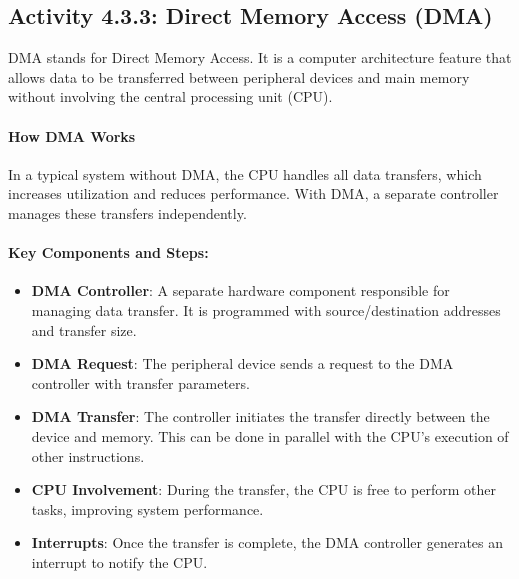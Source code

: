 \documentclass[12pt,a4paper]{article}
\begin{document}

\subsection*{Activity 4.3.3: Direct Memory Access (DMA)}
DMA stands for Direct Memory Access. It is a computer architecture feature that allows data to be transferred between peripheral devices and main memory without involving the central processing unit (CPU).

\paragraph{How DMA Works}
In a typical system without DMA, the CPU handles all data transfers, which increases utilization and reduces performance. With DMA, a separate controller manages these transfers independently.

\paragraph{Key Components and Steps:}
\begin{itemize}
    \item \textbf{DMA Controller}: A separate hardware component responsible for managing data transfer. It is programmed with source/destination addresses and transfer size.
    \item \textbf{DMA Request}: The peripheral device sends a request to the DMA controller with transfer parameters.
    \item \textbf{DMA Transfer}: The controller initiates the transfer directly between the device and memory. This can be done in parallel with the CPU's execution of other instructions.
    \item \textbf{CPU Involvement}: During the transfer, the CPU is free to perform other tasks, improving system performance.
    \item \textbf{Interrupts}: Once the transfer is complete, the DMA controller generates an interrupt to notify the CPU.
\end{itemize}
\end{document}
